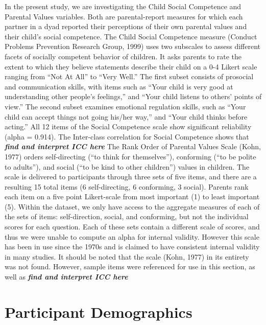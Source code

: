 \documentclass[man]{apa6}
\begin{document}
In the present study, we are investigating the Child Social Competence and Parental Values variables. Both are parental-report measures for which each partner in a dyad reported their perceptions of their own parental values and their child's social competence.
The Child Social Competence measure (Conduct Problems Prevention Research Group, 1999) uses two subscales to assess different facets of socially competent behavior of children. It asks parents to rate the extent to which they believe statements describe their child on a 0-4 Likert scale ranging from \enquote{Not At All} to \enquote{Very Well.} The first subset consists of prosocial and communication skills, with items such as \enquote{Your child is very good at understanding other people's feelings,} and \enquote{Your child listens to others' points of view.} The second subset examines emotional regulation skills, such as \enquote{Your child can accept things not going his/her way,} and \enquote{Your child thinks before acting.} All 12 items of the Social Competence scale show significant reliability (alpha = 0.914). The Inter-class correlation for Social Competence shows that \textbf{\emph{find and interpret ICC here}}
The Rank Order of Parental Values Scale (Kohn, 1977) orders self-directing (\enquote{to think for themselves}), conforming (\enquote{to be polite to adults}), and social (\enquote{to be kind to other children}) values in children. The scale is delivered to participants through three sets of five items, and there are a resulting 15 total items (6 self-directing, 6 conforming, 3 social). Parents rank each item on a five point Likert-scale from most important (1) to least important (5). Within the dataset, we only have access to the aggregate measures of each of the sets of items: self-direction, social, and conforming, but not the individual scores for each question. Each of these sets contain a different scale of scores, and thus we were unable to compute an alpha for internal validity. However this scale has been in use since the 1970s and is claimed to have consistent internal validity in many studies. It should be noted that the scale (Kohn, 1977) in its entirety was not found. However, sample items were referenced for use in this section, as well as \textbf{\emph{find and interpret ICC here }}

\hypertarget{participant-demographics}{%
\section{Participant Demographics}\label{participant-demographics}}
\end{document}
